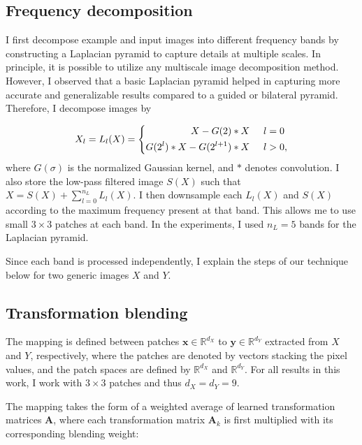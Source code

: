 \subsection{Frequency decomposition}\label{sec:thePatchMap}

I first decompose example and input images into different frequency bands by constructing a Laplacian pyramid to capture details at multiple scales. In principle, it is possible to utilize any multiscale image decomposition method. However, I observed that a basic Laplacian pyramid helped in capturing more accurate and generalizable results compared to a guided or bilateral pyramid. Therefore, I decompose images by

\begin{equation} 
	X_l = L_l(X) = 
 \left \{ \begin{aligned}
        X - G(2) \ast X \hspace{5mm} &l=0\\
        G(2^l) \ast X - G(2^{l+1}) \ast X \hspace{5mm} &l>0,
       \end{aligned}
 \right.
\end{equation}
where $G(\sigma)$ is the normalized Gaussian kernel, and $\ast$ denotes convolution. I also store the low-pass filtered image $S(X)$ such that $X = S(X) + \sum_{l=0}^{n_L} L_l(X)$. I then downsample each $L_l(X)$ and $S(X)$ according to the maximum frequency present at that band. This allows me to use small $3 \times 3$ patches at each band. In the experiments, I used $n_L = 5$ bands for the Laplacian pyramid.


Since each band is processed independently, I explain the steps of our technique below for two generic images $X$ and $Y$.


\subsection{Transformation blending}\label{sec:Blending}

The mapping is defined between patches $\mathbf{x} \in \mathbb{R}^{d_X}$ to $\mathbf{y} \in \mathbb{R}^{d_Y}$ extracted from $X$ and $Y$, respectively, where the patches are denoted by vectors stacking the pixel values, and the patch spaces are defined by $\mathbb{R}^{d_X}$ and  $\mathbb{R}^{d_Y}$. For all results in this work, I work with $3 \times 3$ patches and thus $d_X = d_Y = 9$.

The mapping takes the form of a weighted average of learned transformation matrices $\mathbf{A}$, where each transformation matrix $\mathbf{A}_k$ is first multiplied with its corresponding blending weight: 

